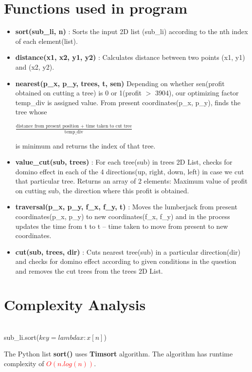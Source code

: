 \documentclass[30pt]{article}
\begin{document}
\section{Functions used in program}
\begin{itemize}
    \item \textbf{sort(sub\_li, n) } : Sorts the input 2D list (sub\_li) according to the nth index of each element(list).
    \item \textbf{distance(x1, x2, y1, y2) } : Calculates distance between two points (x1, y1) and (x2, y2).
    \item \textbf{nearest(p\_x, p\_y, trees, t, sen) } Depending on whether sen(profit obtained on cutting a tree) is 0 or 1(profit $>$ 3904), our optimizing factor temp\_div is assigned value. From present coordinates(p\_x, p\_y), finds the tree whose  
    \begin{center}
         $\frac{\textrm{distance from present position + time taken to cut tree}}{\textrm{temp\_div}}$
    \end{center}
    is minimum and returns the index of that tree.
    \item \textbf{value\_cut(sub, trees) } : For each tree(sub) in trees 2D List, checks for domino effect in each of the 4 directions(up, right, down, left) in case we cut that particular tree. Returns an array of 2 elements: Maximum value of profit on cutting sub, the direction where this profit is obtained.
    \item \textbf{traversal(p\_x, p\_y, f\_x, f\_y, t) } : Moves the lumberjack from present coordinates(p\_x, p\_y) to new coordinates(f\_x, f\_y) and in the process updates the time from t to t – time taken to move from present to new coordinates.
    \item \textbf{cut(sub, trees, dir) } : Cuts nearest tree(sub) in a particular direction(dir) and checks for domino effect according to given conditions in the question and removes the cut trees from the trees 2D List.
\end{itemize}
\newpage

\section{Complexity Analysis}
\begin{algorithm}
 { \\
\hspace{1cm} sub\_li.sort($key=lambda x: x[n]$) \\
\hspace{1cm} 

}
\end{algorithm}
The Python list \textbf{sort()} uses \textbf{Timsort} algorithm. The algorithm has 
runtime complexity of \textcolor{red}{$O(n.log(n))$}. 
\end{document}
